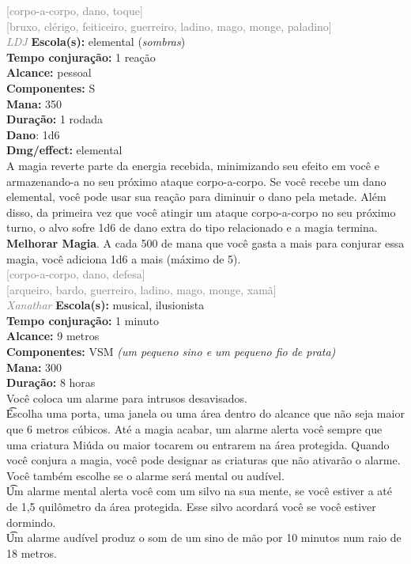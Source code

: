 \documentclass{RPG_Adventure}[2021/10/20]
\begin{document}
{\scriptsize \textcolor{gray}{[corpo-a-corpo, dano, toque]\\}}
{\scriptsize \textcolor{gray}{[bruxo, clérigo, feiticeiro, guerreiro, ladino, mago, monge, paladino]\\}}
{\tiny \textcolor{gray}{\textit{LDJ}}}\jump{}
{\small \t \textbf{Escola(s):} elemental (\textit{sombras})\\\t \textbf{Tempo conjuração:} 1 reação\\\t \textbf{Alcance:} pessoal\\\t \textbf{Componentes:} S\\\t \textbf{Mana:} 350\\\t \textbf{Duração:} 1 rodada\\\t \textbf{Dano}: 1d6\\\t \textbf{Dmg/effect:} elemental\\}
{\normalsize A magia reverte parte da energia recebida, minimizando seu efeito em você e armazenando-a no seu próximo ataque corpo-a-corpo. Se você recebe um dano elemental, você pode usar sua reação para diminuir o dano pela metade. Além disso, da primeira vez que você atingir um ataque corpo-a-corpo no seu próximo turno, o alvo sofre 1d6 de dano extra do tipo relacionado e a magia termina.\\\t \textbf{Melhorar Magia}. A cada 500 de mana que você gasta a mais para conjurar essa magia, você adiciona 1d6 a mais (máximo de 5).\\}
{\scriptsize \textcolor{gray}{[corpo-a-corpo, dano, defesa]\\}}
{\scriptsize \textcolor{gray}{[arqueiro, bardo, guerreiro, ladino, mago, monge, xamã]\\}}
{\tiny \textcolor{gray}{\textit{Xanathar}}}\jump{}
{\small \t \textbf{Escola(s):} musical, ilusionista\\\t \textbf{Tempo conjuração:} 1 minuto\\\t \textbf{Alcance:} 9 metros\\\t \textbf{Componentes:} VSM \textit{(um pequeno sino e um pequeno fio de prata)}\\\t \textbf{Mana:} 300\\\t \textbf{Duração:} 8 horas\\}
{\normalsize Você coloca um alarme para intrusos desavisados.\\\t Escolha uma porta, uma janela ou uma área dentro do alcance que não seja maior que 6 metros cúbicos. Até a magia acabar, um alarme alerta você sempre que uma criatura Miúda ou maior tocarem ou entrarem na área protegida. Quando você conjura a magia, você pode designar as criaturas que não ativarão o alarme. Você também escolhe se o alarme será mental ou audível.\\\t Um alarme mental alerta você com um silvo na sua mente, se você estiver a até de 1,5 quilômetro da área protegida. Esse silvo acordará você se você estiver dormindo.\\\t Um alarme audível produz o som de um sino de mão por 10 minutos num raio de 18 metros. \\}
\end{document}
